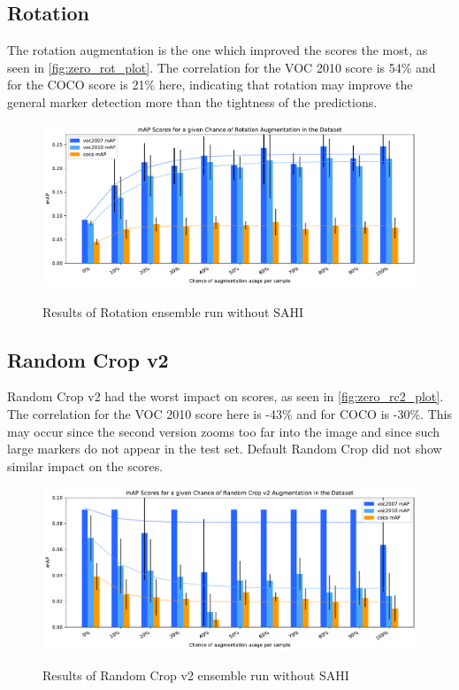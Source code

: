 \documentclass[10pt]{book}
\begin{document}
\subsection{Rotation}

The rotation augmentation is the one which improved the scores the most, as seen in \autoref{fig:zero_rot_plot}. The correlation for the VOC 2010 score is 54\% and for the \ac{COCO} score is 21\% here, indicating that rotation may improve the general marker detection more than the tightness of the predictions. %

\begin{figure}
  \caption{Results of Rotation ensemble run without \ac{SAHI}}
  \includegraphics[width=\textwidth]{image/zero-based-rot-ensemble-2-thesis}
  \label{fig:zero_rot_plot}
\end{figure}


\subsection{Random Crop v2}

Random Crop v2 had the worst impact on scores, as seen in \autoref{fig:zero_rc2_plot}. The correlation for the VOC 2010 score here is -43\% and for \ac{COCO} is -30\%. This may occur since the second version zooms too far into the image and since such large markers do not appear in the test set. Default Random Crop did not show similar impact on the scores.

\begin{figure}
  \caption{Results of Random Crop v2 ensemble run without \ac{SAHI}}
  \includegraphics[width=\textwidth]{image/zero-based-rc2-ensemble-2-thesis}
  \label{fig:zero_rc2_plot}
\end{figure}
\end{document}
